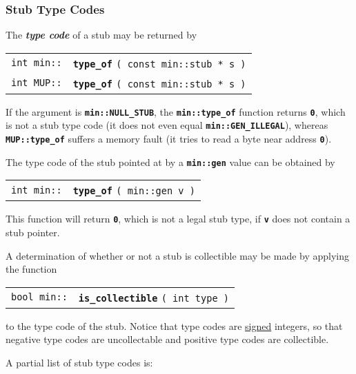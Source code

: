 \documentclass[12pt]{article}
\makeatletter
\newcommand{\TT}[1]{{\tt \bfseries #1}}
\newcommand{\key}[1]{{\bf \em #1}\index{#1}}
\newcommand{\ttindex}[1]{\index{#1@{\tt #1}}}
\newcommand{\minindex}[1]{\ttindex{min::#1}\ttindex{#1}}
\newcommand{\MUPindex}[1]{\ttindex{MUP::#1}\ttindex{#1}}
\newcommand{\EOL}{\penalty \exhyphenpenalty}
\newenvironment{indpar}[1][0.3in]%
	{\begin{list}{}%
		     {\setlength{\itemsep}{0in}%
		      \setlength{\topsep}{0in}%
		      \setlength{\parsep}{1ex}%
		      \setlength{\labelwidth}{#1}%
		      \setlength{\leftmargin}{#1}%
		      \addtolength{\leftmargin}{\labelsep}}%
	 \item}%
	{\end{list}}
\newcommand{\LABEL}[1]{\label{#1}}
\newcommand{\MINKEY}[1]{{\tt \bf #1}\minindex{#1}}
\newcommand{\MUPKEY}[1]{{\tt \bf #1}\MUPindex{#1}}
\makeatother
\begin{document}
\subsubsection{Stub Type Codes}
\label{STUB-TYPE-CODES}

The \key{type code} of a stub may be returned by

\begin{indpar}\begin{tabular}{r@{}l}
\verb|int min::| & \MINKEY{type\_of} \verb|( const min::stub * s )|
\LABEL{MIN::TYPE_OF} \\
\verb|int MUP::| & \MUPKEY{type\_of} \verb|( const min::stub * s )|
\LABEL{MUP::TYPE_OF}
\end{tabular}\end{indpar}

If the argument is \TT{min::NULL\_STUB},
the \TT{min::type\_of} function returns \TT{0}, which is not
a stub type code (it does not even equal \TT{min::GEN\_ILLEGAL}),
whereas \TT{MUP::\EOL type\_\EOL of} suffers a memory fault (it
tries to read a byte near address \TT{0}).

The type code of the stub pointed at by a \TT{min::gen} value
can be obtained by

\begin{indpar}\begin{tabular}{r@{}l}
\verb|int min::| & \MINKEY{type\_of} \verb|( min::gen v )|
\LABEL{MIN::TYPE_OF_GEN}
\end{tabular}\end{indpar}

This function will return \TT{0}, which is not a legal stub type,
if \TT{v} does not contain a stub pointer.

A determination of whether or not a stub is collectible may be made
by applying the function

\begin{indpar}\begin{tabular}{r@{}l}
\verb|bool min::| & \MINKEY{is\_collectible} \verb|( int type )|
\LABEL{MIN::IS_COLLECTIBLE}
\end{tabular}\end{indpar}

to the type code of the stub.  Notice that type codes are \underline{signed}
integers, so that negative type codes are uncollectable and positive type codes
are collectible.

A partial list of stub type codes is:
\end{document}
